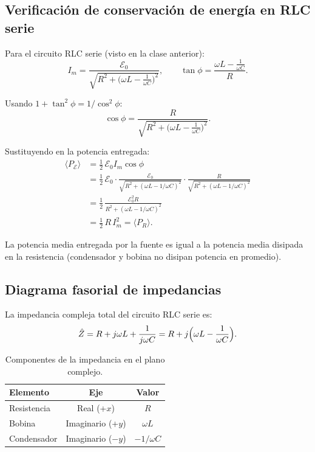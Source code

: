 \documentclass[12pt,a4paper]{article}
\begin{document}
\subsection{Verificación de conservación de energía en RLC serie}

Para el circuito RLC serie (visto en la clase anterior):
\[
I_m = \frac{\mathcal{E}_0}
           {\sqrt{R^2 + \bigl(\omega L - \frac{1}{\omega C}\bigr)^2}},\qquad
\tan\phi = \frac{\omega L - \frac{1}{\omega C}}{R}.
\]

Usando \(1 + \tan^2\phi = 1 / \cos^2\phi\):
\[
\cos\phi = \frac{R}
               {\sqrt{R^2 + \bigl(\omega L - \frac{1}{\omega C}\bigr)^2}}.
\]

Sustituyendo en la potencia entregada:
\[
\begin{aligned}
\langle P_{\mathcal{E}} \rangle
&= \frac12\, \mathcal{E}_0 I_m \cos\phi \\[4pt]
&= \frac12\, \mathcal{E}_0 \cdot
   \frac{\mathcal{E}_0}{\sqrt{R^2 + (\omega L - 1/\omega C)^2}} \cdot
   \frac{R}{\sqrt{R^2 + (\omega L - 1/\omega C)^2}} \\[4pt]
&= \frac12\,
   \frac{\mathcal{E}_0^2 R}{R^2 + (\omega L - 1/\omega C)^2} \\[4pt]
&= \frac12\, R\, I_m^2 = \langle P_R \rangle.
\end{aligned}
\]

\begin{keybox}[Conclusión]
  La potencia media entregada por la fuente es igual a la potencia
  media disipada en la resistencia (condensador y bobina no disipan
  potencia en promedio).
\end{keybox}

\subsection{Diagrama fasorial de impedancias}

La impedancia compleja total del circuito RLC serie es:
\[
\hat{Z} = R + j\omega L + \frac{1}{j\omega C}
        = R + j\Bigl(\omega L - \frac{1}{\omega C}\Bigr).
\]

\begin{table}[H]
  \centering
  \begin{tabular}{lcc}
    \toprule
    \textbf{Elemento} & \textbf{Eje} & \textbf{Valor} \\
    \midrule
    Resistencia     & Real (+\(x\))   & \(R\) \\
    Bobina          & Imaginario (+\(y\)) & \(\omega L\) \\
    Condensador     & Imaginario (\(-y\)) & \(-1/\omega C\) \\
    \bottomrule
  \end{tabular}
  \caption{Componentes de la impedancia en el plano complejo.}
\end{table}
\end{document}
